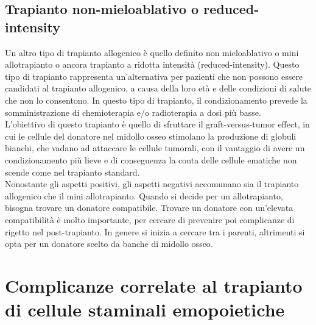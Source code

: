 \subsection{Trapianto non-mieloablativo o reduced-intensity}

Un altro tipo di trapianto allogenico è quello definito non mieloablativo o mini allotrapianto o ancora trapianto a 
ridotta intensità (reduced-intensity). Questo tipo di trapianto rappresenta un’alternativa per pazienti che non 
possono essere candidati al trapianto allogenico, a causa della loro età e delle condizioni di salute che non lo 
consentono. In questo tipo di trapianto, il condizionamento prevede la somministrazione di 
chemioterapia e/o radioterapia a dosi più basse\cite{LLSBLOOD}.\\
L’obiettivo di questo trapianto è quello di sfruttare il graft-versus-tumor effect, in cui le cellule del donatore 
nel midollo osseo stimolano la produzione di globuli bianchi, che vadano ad attaccare le cellule tumorali, con il 
vantaggio di avere un condizionamento più lieve e di conseguenza la conta delle cellule ematiche 
non scende come nel trapianto standard\cite{STEMCELLS}.\\
Nonostante gli aspetti positivi, gli aspetti negativi accomunano sia il trapianto allogenico che il mini allotrapianto.
Quando si decide per un allotrapianto, bisogna trovare un donatore compatibile. Trovare un donatore con 
un’elevata compatibilità è molto importante, per cercare di prevenire poi complicanze di rigetto nel post-trapianto. 
In genere si inizia a cercare tra i parenti, altrimenti si opta per un donatore scelto da banche di midollo osseo\cite{TRAPIANTO}.\\

\section{Complicanze correlate al trapianto di cellule staminali emopoietiche}


